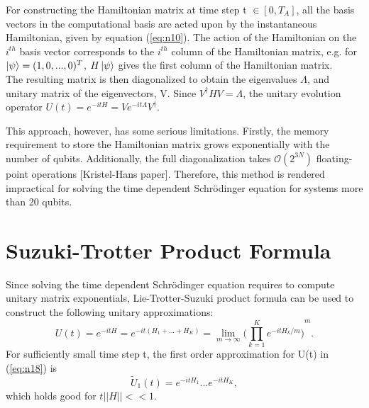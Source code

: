 \documentclass[12]{article}
\begin{document}
For constructing the Hamiltonian matrix at time step t $\in [0,T_A]$, all the basis vectors in the computational basis are acted upon by the instantaneous Hamiltonian, given by equation (\ref{eq:n10}). The action of the Hamiltonian on the $i^{th}$ basis vector corresponds to the $i^{th}$ column of the Hamiltonian matrix, e.g. for $\ket{\psi}=(1,0,...,0)^T$, $H\ket{\psi}$ gives the first column of the Hamiltonian matrix. \\
The resulting matrix is then diagonalized to obtain the eigenvalues $\Lambda$, and unitary matrix of the eigenvectors, V. Since $V^{\dagger}HV=\Lambda$, the unitary evolution operator $U(t)=e^{-itH}=Ve^{-it\Lambda}V^{\dagger}$.


This approach, however, has some serious limitations. Firstly, the memory requirement to store the Hamiltonian matrix grows exponentially with the number of qubits. Additionally, the full diagonalization takes $\mathcal{O}(2^{3N})$ floating-point operations [Kristel-Hans paper]. Therefore, this method is rendered impractical for solving the time dependent Schr{\"o}dinger equation for systems more than 20 qubits.

\section{Suzuki-Trotter Product Formula} 
Since solving the time dependent Schr{\"o}dinger equation requires to compute unitary matrix exponentials, Lie-Trotter-Suzuki product formula can be used to construct the following unitary approximations:
\begin{equation}
U(t)= e^{-itH}= e^{-it(H_1+...+H_K)}= \lim\limits_{m \to \infty} {\bigg(\prod_{k=1}^{K}e^{-itH_k/m} \bigg)}^m.    \label{eq:n18}
\end{equation}
For sufficiently small time step t, the first order approximation for U(t) in (\ref{eq:n18}) is
\begin{equation}
\tilde{U}_1(t)=e^{-itH_1}...e^{-itH_K},    \label{eq:n19}
\end{equation}
which holds good for $t \left| \left| H \right| \right| << 1$.
\end{document}
